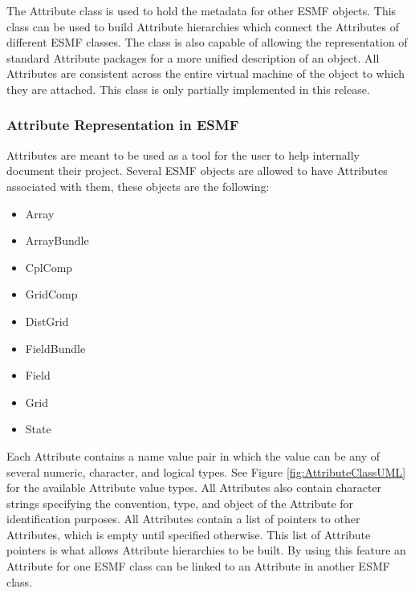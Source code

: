 %

The Attribute class is used to hold the metadata for other ESMF objects.  This class can be used to build Attribute hierarchies which connect the Attributes of different ESMF classes.  The class is also capable of allowing the representation of standard Attribute packages for a more unified description of an object.  All Attributes are consistent across the entire virtual machine of the object to which they are attached.  This class is only partially implemented in this release.

\subsubsection{Attribute Representation in ESMF}

Attributes are meant to be used as a tool for the user to help internally document their project.   Several ESMF objects are allowed to have Attributes associated with them, these objects are the following:

\begin{itemize}
\item Array
\item ArrayBundle
\item CplComp
\item GridComp
\item DistGrid
\item FieldBundle
\item Field
\item Grid
\item State
\end{itemize}

Each Attribute contains a name value pair in which the value can be any of several numeric, character, and logical types.  See Figure \ref{fig:AttributeClassUML} for the available Attribute value types.  All Attributes also contain character strings specifying the convention, type, and object of the Attribute for identification purposes.  All Attributes contain a list of pointers to other Attributes, which is empty until specified otherwise.  This list of Attribute pointers is what allows Attribute hierarchies to be built.  By using this feature an Attribute for one ESMF class can be linked to an Attribute in another ESMF class.

